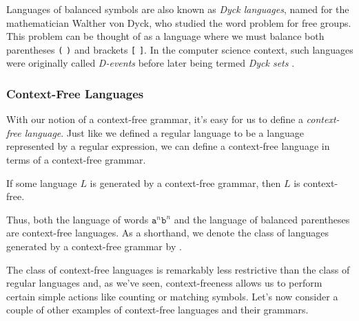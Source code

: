 \begin{remark}
Languages of balanced symbols are also known as \emph{Dyck languages}, named for the mathematician Walther von Dyck, who studied the word problem for free groups. This problem can be thought of as a language where we must balance both parentheses \texttt{(} \texttt{)} and brackets \texttt{[} \texttt{]}. In the computer science context, such languages were originally called \emph{D-events} \citep{Schutzenberger1962CertainElementaryFamilies} before later being termed \emph{Dyck sets} \citep{Schutzenberger1963OnCFLsPDAs}.
\end{remark}

\subsubsection*{Context-Free Languages}

With our notion of a context-free grammar, it's easy for us to define a \emph{context-free language}. Just like we defined a regular language to be a language represented by a regular expression, we can define a context-free language in terms of a context-free grammar.

\begin{definition}\label{def:contextfreelanguage}
If some language $L$ is generated by a context-free grammar, then $L$ is context-free.
\end{definition}

Thus, both the language of words $\texttt{a}^{n}\texttt{b}^{n}$ and the language of balanced parentheses are context-free languages. As a shorthand, we denote the class of languages generated by a context-free grammar by \CFG.

The class of context-free languages is remarkably less restrictive than the class of regular languages and, as we've seen, context-freeness allows us to perform certain simple actions like counting or matching symbols. Let's now consider a couple of other examples of context-free languages and their grammars.

